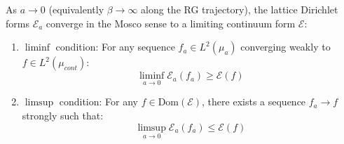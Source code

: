 \begin{theorem}
\label{thm:mosco}
As $a \to 0$ (equivalently $\beta \to \infty$ along the RG trajectory), the lattice Dirichlet forms $\mathcal{E}_a$ converge in the Mosco sense to a limiting continuum form $\mathcal{E}$:
\begin{enumerate}
\item[(M1)] $\liminf$ condition: For any sequence $f_a \in L^2(\mu_a)$ converging weakly to $f \in L^2(\mu_{cont})$:
\begin{equation}
\liminf_{a \to 0} \mathcal{E}_a(f_a) \geq \mathcal{E}(f)
\end{equation}

\item[(M2)] $\limsup$ condition: For any $f \in \text{Dom}(\mathcal{E})$, there exists a sequence $f_a \to f$ strongly such that:
\begin{equation}
\limsup_{a \to 0} \mathcal{E}_a(f_a) \leq \mathcal{E}(f)
\end{equation}
\end{enumerate}
\end{theorem}

